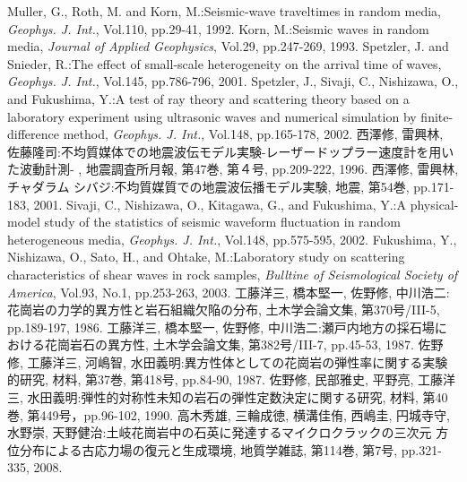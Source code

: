 \documentclass{jsce}
\begin{document}
\begin{thebibliography}{99}
\begin{spacing}{1.175}
	Muller, G., Roth, M. and Korn, M.:Seismic-wave traveltimes in random media,
	{\it Geophys. J. Int.}, Vol.110, pp.29-41, 1992. 
	Korn, M.:Seismic waves in random media, 
	{\it Journal of Applied Geophysics}, Vol.29, pp.247-269, 1993.
	Spetzler, J. and Snieder, R.:The effect of small-scale heterogeneity on the arrival time of waves, 
	{\it Geophys. J. Int.}, Vol.145, pp.786-796, 2001. 
	Spetzler, J., Sivaji, C., Nishizawa, O., and Fukushima, Y.:A test of ray theory and scattering theory based on
	a laboratory experiment using ultrasonic waves and numerical 
\newpage
	simulation by finite-difference method, 
	{\it Geophys. J. Int.}, Vol.148, pp.165-178, 2002. 
	西澤修, 雷興林, 佐藤隆司:不均質媒体での地震波伝モデル実験-レーザードップラー速度計を用いた波動計測-
	, 地震調査所月報, 第47巻, 第４号, pp.209-222, 1996.
	西澤修, 雷興林, チャダラム シバジ:不均質媒質での地震波伝播モデル実験, 
	地震, 第54巻, pp.171-183, 2001.
	Sivaji, C., Nishizawa, O., Kitagawa, G., and Fukushima, Y.:A physical-model study of the statistics of seismic waveform fluctuation in random heterogeneous media, 
	{\it Geophys. J. Int.}, Vol.148, pp.575-595, 2002. 
	Fukushima, Y., Nishizawa, O., Sato, H., and Ohtake, M.:Laboratory study on scattering characteristics of shear waves 
	in rock samples, {\it Bulltine of Seismological Society of America}, Vol.93, No.1, pp.253-263, 2003.
	工藤洋三, 橋本堅一, 佐野修, 中川浩二:花崗岩の力学的異方性と岩石組織欠陥の分布,
	土木学会論文集, 第370号/III-5, pp.189-197, 1986.
	工藤洋三, 橋本堅一, 佐野修, 中川浩二:瀬戸内地方の採石場における花崗岩石の異方性, 
	土木学会論文集, 第382号/III-7, pp.45-53, 1987.
	佐野修, 工藤洋三, 河嶋智, 水田義明:異方性体としての花崗岩の弾性率に関する実験的研究, 
	材料, 第37巻, 第418号, pp.84-90, 1987.
	佐野修, 民部雅史, 平野亮, 工藤洋三, 水田義明:弾性的対称性未知の岩石の弾性定数決定に関する研究, 
	材料, 第40巻, 第449号，pp.96-102, 1990.
	高木秀雄, 三輪成徳, 横溝佳侑, 西嶋圭, 円城寺守, 水野崇, 天野健治:土岐花崗岩中の石英に発達するマイクロクラックの三次元
	方位分布による古応力場の復元と生成環境, 地質学雑誌, 第114巻, 第7号, pp.321-335, 2008.
\end{spacing}
\end{thebibliography}
\end{document}
